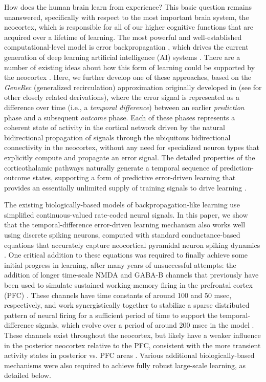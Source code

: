 \documentclass[11pt,twoside]{article}
\newif\myifpdf
\begin{document}
How does the human brain learn from experience?  This basic question remains unanswered, specifically with respect to the most important brain system, the neocortex, which is responsible for all of our higher cognitive functions that are acquired over a lifetime of learning.  The most powerful and well-established computational-level model is error backpropagation \citep{RumelhartHintonWilliams86}, which drives the current generation of deep learning artificial intelligence (AI) systems \citep{LeCunBengioHinton15}.  There are a number of existing ideas about how this form of learning could be supported by the neocortex \citep{WhittingtonBogacz19,LillicrapSantoroMarrisEtAl20}.  Here, we further develop one of these approaches, based on the \textit{GeneRec} (generalized recirculation) approximation originally developed in \citet{OReilly96} (see \citealp{XieSeung03,ScellierBengio17} for other closely related derivations), where the error signal is represented as a difference over time (i.e., a \textit{temporal difference}) between an earlier \textit{prediction} phase and a subsequent \textit{outcome} phase.  Each of these phases represents a coherent state of activity in the cortical network driven by the natural bidirectional propagation of signals through the ubiquitous bidirectional connectivity in the neocortex, without any need for specialized neuron types that explicitly compute and propagate an error signal.  The detailed properties of the corticothalamic pathways naturally generate a temporal sequence of prediction-outcome states, supporting a form of predictive error-driven learning that provides an essentially unlimited supply of training signals to drive learning \citep{OReillyRussinZolfagharEtAl20}.

The existing biologically-based models of backpropagation-like learning use simplified continuous-valued rate-coded neural signals.  In this paper, we show that the temporal-difference error-driven learning mechanism also works well using discrete spiking neurons, computed with standard conductance-based equations that accurately capture neocortical pyramidal neuron spiking dynamics \citep{BretteGerstner05,GerstnerNaud09}.  One critical addition to these equations was required to finally achieve some initial progress in learning, after many years of unsuccessful attempts: the addition of longer time-scale NMDA and GABA-B channels that previously have been used to simulate sustained working-memory firing in the prefrontal cortex (PFC) \citep{SandersBerendsMajorEtAl13}.  These channels have time constants of around 100 and 50 msec, respectively, and work synergistically together to stabilize a sparse distributed pattern of neural firing for a sufficient period of time to support the temporal-difference signals, which evolve over a period of around 200 msec in the model \citep{OReillyRussinZolfagharEtAl21}.  These channels exist throughout the neocortex, but likely have a weaker influence in the posterior neocortex relative to the PFC, consistent with the more transient activity states in posterior vs. PFC areas \citep[e.g.,]{MillerEricksonDesimone96}.  Various additional biologically-based mechanisms were also required to achieve fully robust large-scale learning, as detailed below.
\end{document}
